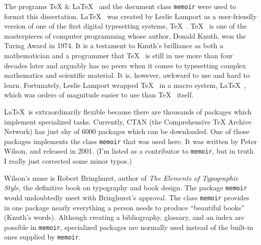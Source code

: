 \begin{center}
  \textbf{\qquad\qquad{}\qquad\qquad{}\qquad\qquad{}\qquad\qquad{}}
\end{center}

The programs \TeX{} \& \LaTeX{}  and the document class \texttt{memoir} were used to format this dissertation. \LaTeX  was created by Leslie Lamport as a user-friendly version of one of the first digital typesetting systems, \TeX . \TeX  is one of the masterpieces of computer programming whose author, Donald Knuth, won the Turing Award in 1974. It is a testament to Knuth's brilliance as both a mathematician and a programmer that \TeX  is still in use more than four decades later and arguably has no peers when it comes to typesetting complex mathematics and scientific material. It is, however, awkward to use and hard to learn. Fortunately, Leslie Lamport wrapped \TeX  in a macro system, \LaTeX , which was orders of magnitude easier to use than \TeX  itself.

\LaTeX is extraordinarily flexible because there are thousands of packages which implement specialized tasks. Currently, CTAN (the Comprehensive TeX Archive Network) has just shy of 6000 packages which can be downloaded. One of those packages implements the class \texttt{memoir} that was used here. It was written by Peter Wilson, and released in 2001. (I'm listed as a contributor to \texttt{memoir}, but in truth I really just corrected some minor typos.)

\begin{center}
  \textbf{\qquad\qquad{}\qquad\qquad{}\qquad\qquad{}\qquad\qquad{}}
\end{center}

Wilson's muse is Robert Bringhurst, author of \textit{The Elements of Typographic Style}, the definitive book on typography and book design. The package \texttt{memoir} would undoubtedly meet with Bringhurst's approval.  The class \texttt{memoir} provides in one package nearly everything a person needs to produce ``beautiful books'' (Knuth's words). Although creating a bibliography, glossary, and an index are possible in \texttt{memoir}, specialized packages are normally used instead of the built-in ones supplied by \texttt{memoir}.

\begin{center}
  \textbf{\qquad\qquad{}\qquad\qquad{}\qquad\qquad{}\qquad\qquad{}}
\end{center}

